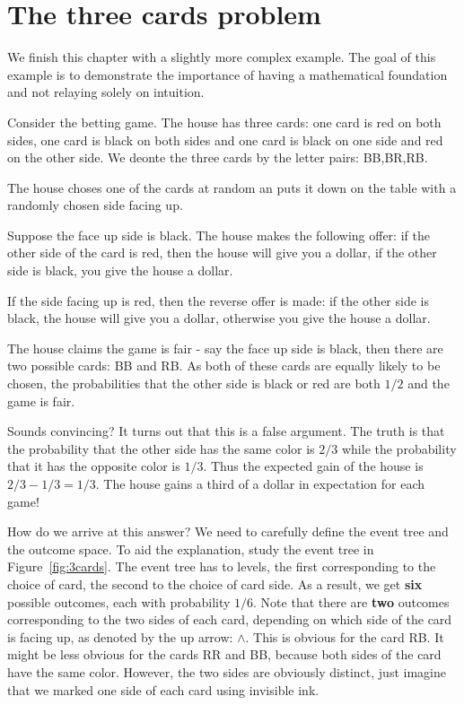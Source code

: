 \section{The three cards problem}

We finish this chapter with a slightly more complex example. The goal
of this example is to demonstrate the importance of having a
mathematical foundation and not relaying solely on intuition.

Consider the betting game. The house has three cards: one card is red
on both sides, one card is black on both sides and one card is black
on one side and red on the other side. We deonte the three cards by
the letter pairs: BB,BR,RB.

The house choses one of the cards at random an puts it down on the
table with a randomly chosen side facing up.

Suppose the face up side is black. The house makes the following
offer: if the other side of the card is red, then the house will give
you a dollar, if the other side is black, you give the house a dollar.

If the side facing up is red, then the reverse offer is made: if the
other side is black, the house will give you a dollar, otherwise you
give the house a dollar.

The house claims the game is fair - say the face up side is black,
then there are two possible cards: BB and RB. As both of these cards
are equally likely to be chosen, the probabilities that the other side
is black or red are both $1/2$ and the game is fair.

Sounds convincing? It turns out that this is a false argument. The
truth is that the probability that the other side has the same color
is $2/3$ while the probability that it has the opposite color is
$1/3$. Thus the expected gain of the house is $2/3-1/3=1/3$. The house
gains a third of a dollar in expectation for each game!

How do we arrive at this answer? We need to carefully define the event
tree and the outcome space. To aid the explanation, study the event
tree in Figure~\ref{fig:3cards}. The event tree has to levels, the
first corresponding to the choice of card, the second to the choice of
card side. As a result, we get {\bf six} possible outcomes, each with
probability $1/6$. Note that there are {\bf two} outcomes
corresponding to the two sides of each card, depending on which side
of the card is facing up, as denoted by the up arrow: $\wedge$. This is
obvious for the card RB. It might be less obvious for the cards RR and
BB, because both sides of the card have the same color. However, the
two sides are obviously distinct, just imagine that we marked one side
of each card using invisible ink.

